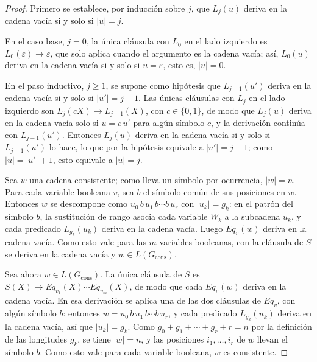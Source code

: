 \documentclass{report}
\theoremstyle{definition}
\theoremstyle{plain}
\begin{document}
\begin{proof}
Primero se establece, por inducción sobre $j$, que $L_j(u)$ deriva en
la cadena vacía si y solo si $|u| = j$.

En el caso base, $j = 0$, la única cláusula con $L_0$ en el lado
izquierdo es $L_0(\varepsilon) \to \varepsilon$, que solo aplica cuando
el argumento es la cadena vacía; así, $L_0(u)$ deriva en la cadena
vacía si y solo si $u = \varepsilon$, esto es, $|u| = 0$.

En el paso inductivo, $j \ge 1$, se supone como hipótesis que
$L_{j-1}(u')$ deriva en la cadena vacía si y solo si $|u'| = j-1$. Las
únicas cláusulas con $L_j$ en el lado izquierdo son
$L_j(cX) \to L_{j-1}(X)$, con $c \in \{0,1\}$, de modo que $L_j(u)$
deriva en la cadena vacía solo si $u = c\,u'$ para algún símbolo $c$, y
la derivación continúa con $L_{j-1}(u')$. Entonces $L_j(u)$ deriva en
la cadena vacía si y solo si $L_{j-1}(u')$ lo hace, lo que por la
hipótesis equivale a $|u'| = j-1$; como $|u| = |u'| + 1$, esto equivale
a $|u| = j$.

Sea $w$ una cadena consistente; como lleva un símbolo por ocurrencia,
$|w| = n$. Para cada variable booleana $v$, sea $b$ el símbolo común
de sus posiciones en $w$. Entonces $w$ se descompone como
$u_0\, b\, u_1\, b \cdots b\, u_r$ con $|u_k| = g_k$: en el patrón
del símbolo $b$, la sustitución de rango asocia cada variable $W_k$ a
la subcadena $u_k$, y cada predicado $L_{g_k}(u_k)$ deriva en la
cadena vacía. Luego $Eq_v(w)$ deriva en la cadena vacía. Como esto
vale para las $m$ variables booleanas, con la cláusula de $S$ se
deriva en la cadena vacía y $w \in L(G_{\mathrm{cons}})$.

Sea ahora $w \in L(G_{\mathrm{cons}})$. La única cláusula de $S$ es
$S(X) \to Eq_{v_1}(X) \cdots Eq_{v_m}(X)$, de modo que cada $Eq_v(w)$
deriva en la cadena vacía. En esa derivación se aplica una de las dos
cláusulas de $Eq_v$, con algún símbolo $b$: entonces
$w = u_0\, b\, u_1\, b \cdots b\, u_r$, y cada predicado
$L_{g_k}(u_k)$ deriva en la cadena vacía, así que $|u_k| = g_k$. Como
$g_0 + g_1 + \cdots + g_r + r = n$ por la definición de las
longitudes $g_k$, se tiene $|w| = n$, y las posiciones
$i_1, \ldots, i_r$ de $w$ llevan el símbolo $b$. Como esto vale para
cada variable booleana, $w$ es consistente.
\end{proof}
\end{document}

